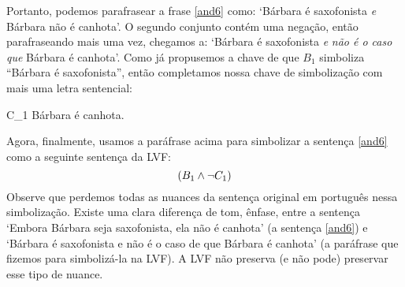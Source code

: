 Portanto, podemos parafrasear a frase \ref{and6} como: `Bárbara é saxofonista \emph{e} Bárbara não é canhota'.
O segundo conjunto contém uma negação, então parafraseando mais uma vez, chegamos a: `Bárbara é saxofonista \emph{e} \emph{não é o caso que} Bárbara é canhota'.
Como já propusemos a chave de que $B_1$ simboliza ``Bárbara é saxofonista'', então completamos nossa chave de simbolização com mais uma letra sentencial:
	\begin{ekey}
		\item[C_1] Bárbara é canhota.
	\end{ekey}
Agora, finalmente, usamos a paráfrase acima para simbolizar a sentença \ref{and6} como a seguinte sentença da LVF:
$$(B_1 \wedge \neg C_1)$$
Observe que perdemos todas as nuances da sentença original em português nessa simbolização.
Existe uma clara diferença de tom, ênfase, entre a sentença `Embora Bárbara seja saxofonista, ela não é canhota' (a sentença \ref{and6}) e `Bárbara é saxofonista e não é o caso de que Bárbara é canhota' (a paráfrase que fizemos para simbolizá-la na LVF).
A LVF não preserva (e não pode) preservar esse tipo de nuance.

